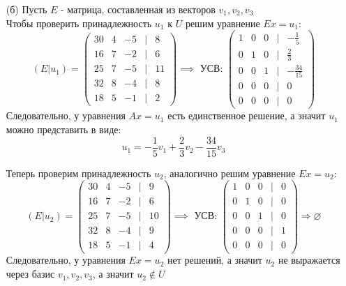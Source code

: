 \documentclass[a4paper]{article}
\renewcommand{\r}{\Rightarrow}
\begin{document}
\begin{enumerate}
\begin{enumerate}
    \item[(б)]Пусть $E$ - матрица, составленная из векторов $v_1, v_2, v_3$\\
    Чтобы проверить принадлежность $u_1$ к $U$ решим уравнение ${Ex= u_1}$:
    $$(E|u_1) = \begin{pmatrix}
        30 & 4 & -5 &|& 8 \\
        16 & 7 & -2  &|& 6\\
        25 & 7 & -5 &|& 11 \\
        32 & 8 & -4  &|& 8\\
        18 & 5 & -1&|& 2
       \end{pmatrix} \implies \text{ УСВ: } \begin{pmatrix}
        1 & 0 & 0 &|& -\frac{1}{5} \\
        0 & 1 & 0 & |&\frac{2}{3} \\
        0 & 0 & 1 & |&-\frac{34}{15} \\
        0 & 0 & 0 & |&0 \\
        0 & 0 & 0 &|& 0
        \end{pmatrix}
        $$
    Следовательно, у уравнения $Ax= u_1$ есть единственное решение, а значит $u_1$ можно представить в виде:
    $$u_1 = -\frac{1}{5}v_1 + \frac{2}{3}v_2 -\frac{34}{15}v_3 $$
   
    Теперь проверим принадлежность $u_2$, аналогично решим уравнение $Ex = u_2$:
    $$(E|u_2)= \begin{pmatrix}
        30 & 4 & -5 &|& 9 \\
        16 & 7 & -2  &|& 6\\
        25 & 7 & -5 &|& 10 \\
        32 & 8 & -4  &|& 9\\
        18 & 5 & -1&|& 4
       \end{pmatrix} \implies \text{ УСВ: } \begin{pmatrix}
        1 & 0 & 0 &|& 0 \\
        0 & 1 & 0 &|& 0 \\
        0 & 0 & 1 &|& 0 \\
        0 & 0 & 0 &|& 1 \\
        0 & 0 & 0 &|& 0
        \end{pmatrix}
        \r \varnothing$$
    Следовательно, у уравнения $Ex = u_2$ нет решений, а значит $u_2$ не выражается через базис $v_1, v_2, v_3$, а значит $u_2 \notin U$\\

    \end{enumerate}


\end{enumerate}
\end{document}
